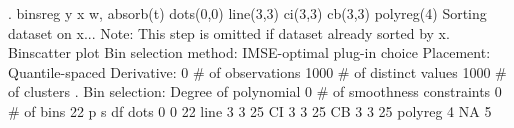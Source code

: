 . binsreg y x w, absorb(t) dots(0,0) line(3,3) ci(3,3) cb(3,3) polyreg(4)
Sorting dataset on x...
Note: This step is omitted if dataset already sorted by x.
{\smallskip}
Binscatter plot
Bin selection method: IMSE-optimal plug-in choice
Placement: Quantile-spaced
Derivative: 0
{\smallskip}
\# of observations             {\VBAR}    1000
\# of distinct values          {\VBAR}    1000
\# of clusters                 {\VBAR}       .
Bin selection:                {\VBAR} 
         Degree of polynomial {\VBAR}       0
  \# of smoothness constraints {\VBAR}       0
                    \# of bins {\VBAR}      22
{\smallskip}
         {\VBAR}      p       s       df
 dots    {\VBAR}      0       0       22
 line    {\VBAR}      3       3       25
 CI      {\VBAR}      3       3       25
 CB      {\VBAR}      3       3       25
 polyreg {\VBAR}      4       NA      5
